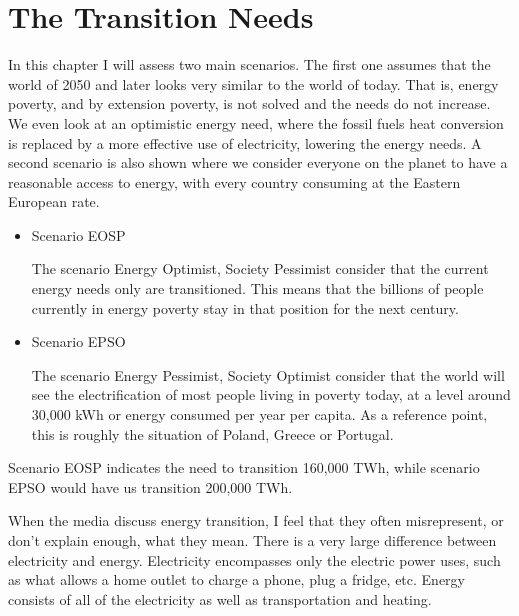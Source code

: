\setchapterpreamble[u]{\margintoc}
\chapter{The Transition Needs}

In this chapter I will assess two main scenarios. The first one assumes that the world of 2050 and later looks very similar to the world of today. That is, energy poverty, and by extension poverty, is not solved and the needs do not increase. We even look at an optimistic energy need, where the fossil fuels heat conversion is replaced by a more effective use of electricity, lowering the energy needs. A second scenario is also shown where we consider everyone on the planet to have a reasonable access to energy, with every country consuming at the Eastern European rate.

\begin{kaobox}[frametitle=Transition Scenarios]
\begin{itemize}
\item Scenario EOSP

The scenario Energy Optimist, Society Pessimist consider that the current energy needs only are transitioned. This means that the billions of people currently in energy poverty stay in that position for the next century.

\item Scenario EPSO

The scenario Energy Pessimist, Society Optimist consider that the world will see the electrification of most people living in poverty today, at a level  around 30,000 kWh or energy consumed per year per capita. As a reference point, this is roughly the situation of Poland, Greece or Portugal.
\end{itemize}
\end{kaobox}

Scenario EOSP indicates the need to transition 160,000 TWh, while scenario EPSO would have us transition 200,000 TWh.




When the media discuss energy transition, I feel that they often misrepresent, or don't explain enough, what they mean. There is a very large difference between electricity and energy. Electricity encompasses only the electric power uses, such as what allows a home outlet to charge a phone, plug a fridge, etc. Energy consists of all of the electricity as well as transportation and heating.

